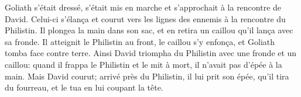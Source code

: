 Goliath s’était dressé, s’était mis en marche et s’approchait à la rencontre de David.
	Celui-ci s’élança et courut vers les lignes des ennemis à la rencontre du Philistin.
Il plongea la main dans son sac, et en retira un caillou qu’il lança avec sa fronde.
Il atteignit le Philistin au front, le caillou s’y enfonça,
	et Goliath tomba face contre terre.
Ainsi David triompha du Philistin avec une fronde et un caillou:
	quand il frappa le Philistin et le mit à mort, il n’avait pas d’épée à la main.
Mais David courut;
	arrivé près du Philistin, il lui prit son épée, qu’il tira du fourreau,
	et le tua en lui coupant la tête.
